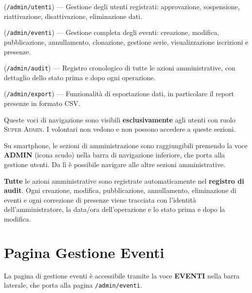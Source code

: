\documentclass[a4paper,11pt,oneside]{book}
\newcommand{\menuitem}[1]{\textsf{\textbf{#1}}}
\newcommand{\percorso}[1]{\textcolor{namoCyan}{\texttt{#1}}}
\newcommand{\ruolo}[1]{\textsc{#1}}
\begin{document}
\begin{description}[leftmargin=1.5em, style=nextline]
  \item[\menuitem{UTENTI}] (\percorso{/admin/utenti}) --- Gestione degli utenti registrati: approvazione, sospensione, riattivazione, disattivazione, eliminazione dati.
  \item[\menuitem{EVENTI}] (\percorso{/admin/eventi}) --- Gestione completa degli eventi: creazione, modifica, pubblicazione, annullamento, clonazione, gestione serie, visualizzazione iscrizioni e presenze.
  \item[\menuitem{AUDIT}] (\percorso{/admin/audit}) --- Registro cronologico di tutte le azioni amministrative, con dettaglio dello stato prima e dopo ogni operazione.
  \item[\menuitem{EXPORT}] (\percorso{/admin/export}) --- Funzionalit\`a di esportazione dati, in particolare il report presenze in formato CSV.
\end{description}

Queste voci di navigazione sono visibili \textbf{esclusivamente} agli utenti con ruolo \ruolo{Super Admin}. I volontari non vedono e non possono accedere a queste sezioni.

\begin{tipbox}
Su smartphone, le sezioni di amministrazione sono raggiungibili premendo la voce \menuitem{ADMIN} (icona scudo) nella barra di navigazione inferiore, che porta alla gestione utenti. Da l\`i \`e possibile navigare alle altre sezioni amministrative.
\end{tipbox}

\begin{infobox}
\textbf{Tutte} le azioni amministrative sono registrate automaticamente nel \textbf{registro di audit}. Ogni creazione, modifica, pubblicazione, annullamento, eliminazione di eventi e ogni correzione di presenze viene tracciata con l'identit\`a dell'amministratore, la data/ora dell'operazione e lo stato prima e dopo la modifica.
\end{infobox}

\section{Pagina Gestione Eventi}
\label{sec:pagina-gestione-eventi}

La pagina di gestione eventi \`e accessibile tramite la voce \menuitem{EVENTI} nella barra laterale, che porta alla pagina \percorso{/admin/eventi}.
\end{document}
